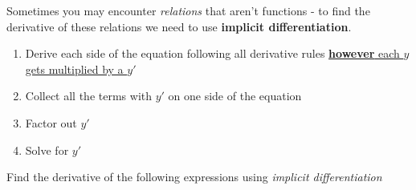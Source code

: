 \documentclass[addpoints]{exam}
\theoremstyle{definition}
\theoremstyle{plain}
\begin{document}
\begin{tcolorbox}[breakable, title=\subsection{IMPLICIT DIFFERENTIATION}, colframe=black, sharp corners, colback=Azure4!70, colbacktitle=DeepPink2!60, coltitle=black]
    Sometimes you may encounter \emph{relations} that aren't functions - to find the derivative of these relations we need to use \textbf{implicit differentiation}. 
    \begin{tcolorbox}[breakable, title=\subsection{STEPS FOR IMPLICIT DIFFERENTIATION}, colframe=black, sharp corners, colback=Azure4!30, colbacktitle=DeepPink1!30, coltitle=black]
        \begin{enumerate}
            \item Derive each side of the equation following all derivative rules \underline{\textbf{however} each $y$ gets multiplied by a $y'$}
            \item Collect all the terms with $y'$ on one side of the equation
            \item Factor out $y'$
            \item Solve for $y'$
        \end{enumerate}
    \end{tcolorbox}
\end{tcolorbox}
Find the derivative of the following expressions using \emph{implicit differentiation}
\end{document}
